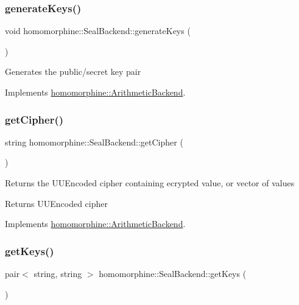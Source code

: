 \subsubsection{\texorpdfstring{generateKeys()}{generateKeys()}}
{\footnotesize\ttfamily void homomorphine\+::\+Seal\+Backend\+::generate\+Keys (\begin{DoxyParamCaption}{ }\end{DoxyParamCaption})\hspace{0.3cm}{\ttfamily [virtual]}}

Generates the public/secret key pair 

Implements \mbox{\hyperlink{classhomomorphine_1_1_arithmetic_backend_a5faa0089b80be5629d4a0a7a02fe3568}{homomorphine\+::\+Arithmetic\+Backend}}.

\mbox{\label{classhomomorphine_1_1_seal_backend_a0917c586791e74b83f4ca0932e5e4d8e}} 
\subsubsection{\texorpdfstring{getCipher()}{getCipher()}}
{\footnotesize\ttfamily string homomorphine\+::\+Seal\+Backend\+::get\+Cipher (\begin{DoxyParamCaption}{ }\end{DoxyParamCaption})\hspace{0.3cm}{\ttfamily [virtual]}}

Returns the U\+U\+Encoded cipher containing ecrypted value, or vector of values

\begin{DoxyReturn}{Returns}
U\+U\+Encoded cipher 
\end{DoxyReturn}


Implements \mbox{\hyperlink{classhomomorphine_1_1_arithmetic_backend_acf38918fb556703ccb12b63dc73b15ed}{homomorphine\+::\+Arithmetic\+Backend}}.

\mbox{\label{classhomomorphine_1_1_seal_backend_a30358e6405e2d1470468cf55aefb3f4d}} 
\subsubsection{\texorpdfstring{getKeys()}{getKeys()}}
{\footnotesize\ttfamily pair$<$ string, string $>$ homomorphine\+::\+Seal\+Backend\+::get\+Keys (\begin{DoxyParamCaption}{ }\end{DoxyParamCaption})\hspace{0.3cm}{\ttfamily [virtual]}}

